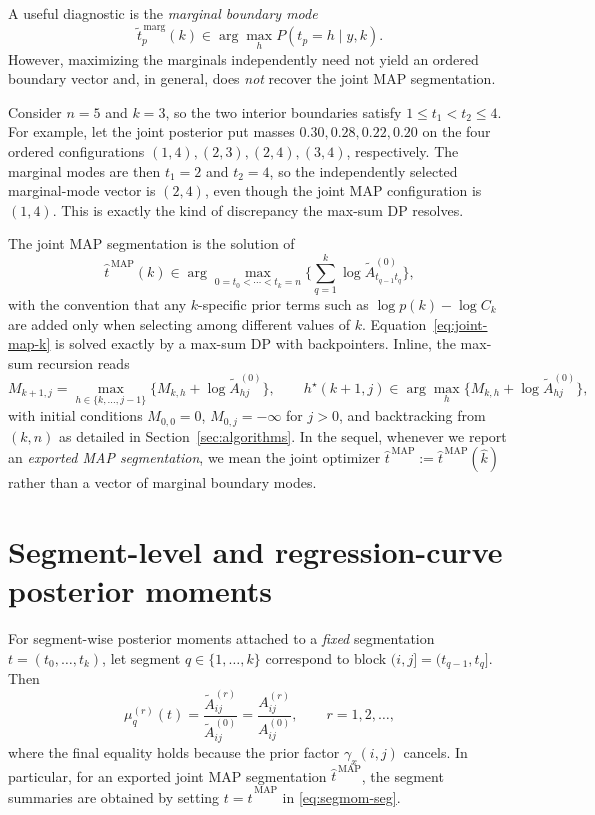 A useful diagnostic is the \emph{marginal boundary mode}
\[
\widetilde{t}^{\,\mathrm{marg}}_p(k)
  \in \arg\max_h P(t_p=h\mid y,k).
\]
However, maximizing the marginals independently need not yield an ordered boundary vector and, in
general, does \emph{not} recover the joint MAP segmentation.

\begin{remark}
\label{rem:marg-vs-joint}
Consider $n=5$ and $k=3$, so the two interior boundaries satisfy $1\le t_1<t_2\le4$.
For example, let the joint posterior put masses $0.30,0.28,0.22,0.20$ on the four ordered
configurations $(1,4),(2,3),(2,4),(3,4)$, respectively. The marginal modes are then
$t_1=2$ and $t_2=4$, so the independently selected marginal-mode vector is $(2,4)$, even though
the joint MAP configuration is $(1,4)$. This is exactly the kind of discrepancy the max-sum DP
resolves.
\end{remark}

The joint MAP segmentation is the solution of
\begin{equation}
\widehat{t}^{\,\mathrm{MAP}}(k)
 \in \arg\max_{0=t_0<\cdots<t_k=n}
 \Bigg\{\sum_{q=1}^k \log \widetilde{A}^{(0)}_{t_{q-1} t_q}\Bigg\},
\label{eq:joint-map-k}
\end{equation}
with the convention that any $k$-specific prior terms such as $\log p(k)-\log C_k$ are added only
when selecting among different values of $k$. Equation~\eqref{eq:joint-map-k} is solved exactly by
a max-sum DP with backpointers. Inline, the max-sum recursion reads
\begin{equation}
M_{k+1,j} = \max_{h\in\{k,\dots,j-1\}}\big\{M_{k,h} + \log \widetilde{A}^{(0)}_{hj}\big\},
\qquad
h^\star(k+1,j) \in \arg\max_{h} \big\{M_{k,h} + \log \widetilde{A}^{(0)}_{hj}\big\},
\label{eq:max-sum-inline}
\end{equation}
with initial conditions $M_{0,0}=0$, $M_{0,j}=-\infty$ for $j>0$, and backtracking from
$(k,n)$ as detailed in Section~\ref{sec:algorithms}.
In the sequel, whenever we report an \emph{exported MAP segmentation}, we mean the joint optimizer
$\widehat{t}^{\,\mathrm{MAP}}:=\widehat{t}^{\,\mathrm{MAP}}(\widehat{k})$ rather than a vector of marginal
boundary modes.

\section{Segment-level and regression-curve posterior moments}
For segment-wise posterior moments attached to a \emph{fixed} segmentation
$t=(t_0,\dots,t_k)$, let segment $q\in\{1,\dots,k\}$ correspond to block
$(i,j]=(t_{q-1},t_q]$. Then
\begin{equation}
\mu^{(r)}_q(t)
 = \frac{\widetilde{A}^{(r)}_{ij}}{\widetilde{A}^{(0)}_{ij}}
 = \frac{A^{(r)}_{ij}}{A^{(0)}_{ij}},
\qquad r=1,2,\dots,
\label{eq:segmom-seg}
\end{equation}
where the final equality holds because the prior factor $\gamma_x(i,j)$ cancels. In particular, for
an exported joint MAP segmentation $\widehat{t}^{\,\mathrm{MAP}}$, the segment summaries are obtained by
setting $t=\widehat{t}^{\,\mathrm{MAP}}$ in \eqref{eq:segmom-seg}.

